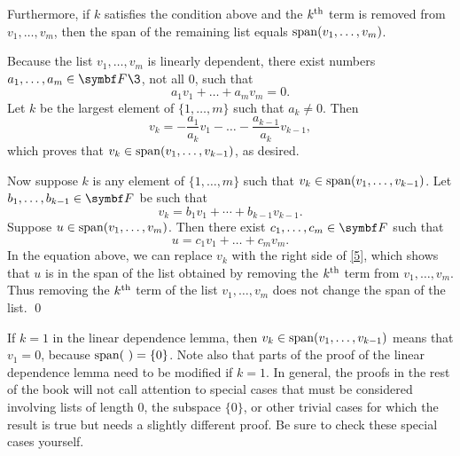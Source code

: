 {{Furthermore, if $k$ satisfies the condition above and the $k^{\text{{th}}}$ term is removed from $v_1, \dots, v_m$,
then the span of the remaining list equals $\operatorname{span}(v_1, \dots, v_m)$.}

\proof
Because the list $v_1, \dots, v_m$ is linearly dependent,
there exist numbers $a_1, \dots, a_m \in \F{}\3$, not all $0$, such that
\[
a_1 v_1 + \dots + a_m v_m = 0.
\]
Let $k$ be
the largest element of $\{1, \dots, m \}$ such that $a_k \ne 0$.  Then
\[
v_k = -\frac{a_1}{a_k} v_1 - \dots - \frac{a_{k-1}}{a_k} v_{k-1},
\]
which proves that $v_k \in \operatorname{span}(v_1, \dots, v_{k-1})$, as desired.
} %

\pagebreak[3]

Now suppose $k$ is any element of $\{1, \dots, m \}$ such that $v_k \in \operatorname{span}(v_1, \dots, v_{k-1})$. Let $b_1, \ldots, b_{k-1} \in \F{}$ be such that
\begin{equation} \label{5}
v_k = b_1 v_1 + \cdots + b_{k-1} v_{k-1}.
\end{equation}%
Suppose $u \in \operatorname{span}(v_1, \dots, v_m)$.  Then there exist $c_1, \dots, c_m \in \F{}$ such that
\[
u = c_1 v_1 + \dots + c_m v_m.
\]
In the equation above, we can replace $v_k$ with the right side of \ref{5}, which
shows that $u$ is in the span of the list obtained by removing the
$k^{\text{{th}}}$ term from $v_1, \dots, v_m$.  Thus removing the $k^{\text{{th}}}$ term of the list $v_1, \dots, v_m$ does not change the span of the list.
\qed

If $k = 1$ in the linear dependence lemma, then $v_k \in \operatorname{span}(v_1, \dots, v_{k-1})$ means that $v_1 = 0$, because $\operatorname{span}(\ ) = \{0\}$. Note also that parts of the proof of the linear dependence lemma need to be modified if $k = 1$. In general, the proofs in the rest of the book will not call attention to special cases that must be considered involving lists of length $0$, the subspace $\{0\}$, or other trivial cases for which the result is true but needs a slightly different proof. Be sure to check these special cases yourself.

